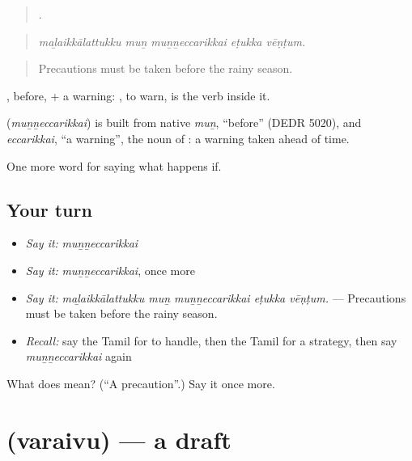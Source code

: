 \begin{quote}
    .
\end{quote}

\begin{quote}
\emph{maḻaikkālattukku muṉ muṉṉeccarikkai eṭukka vēṇṭum.}
\end{quote}

\begin{quote}
Precautions must be taken before the rainy season.
\end{quote}

, before, + a warning: , to warn, is the verb inside it.

\begin{cousinweb}
\textbf{} (\emph{muṉṉeccarikkai}) is built from native \emph{muṉ}, \textquotedblleft{}before\textquotedblright{} (DEDR 5020), and \emph{eccarikkai}, \textquotedblleft{}a warning\textquotedblright{}, the noun of : a warning taken ahead of time.
\end{cousinweb}

\begin{grammarlens}[title={What you've built}]
One more word for saying what happens if.
\end{grammarlens}

\subsection*{Your turn}
\begin{itemize}
\raggedright
  \item \emph{Say it:} \emph{muṉṉeccarikkai}
  \item \emph{Say it:} \emph{muṉṉeccarikkai}, once more
  \item \emph{Say it:} \emph{maḻaikkālattukku muṉ muṉṉeccarikkai eṭukka vēṇṭum.} — Precautions must be taken before the rainy season.
  \item \emph{Recall:} say the Tamil for to handle, then the Tamil for a strategy, then say \emph{muṉṉeccarikkai} again
\end{itemize}

\begin{tcolorbox}[breakable,colback=teal!4,colframe=teal!35!black,title={Before you move on}]
What does  mean? (\textquotedblleft{}A precaution\textquotedblright{}.) Say it once more.
\end{tcolorbox}
\section[\texorpdfstring{\ta{வரைவு} (varaivu)}{வரைவு (varaivu)}]{ (varaivu) — a draft}

